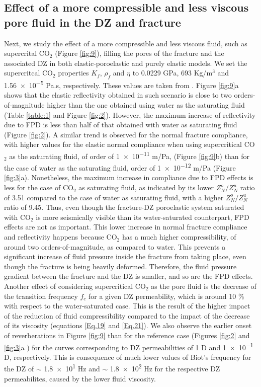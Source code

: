 \documentclass[draft]{agujournal2019}
\begin{document}
\subsection{Effect of a more compressible and less viscous pore fluid in the DZ and fracture}
Next, we study the effect of a more compressible and less viscous fluid, such as supercrital  CO$_2$ (Figure \ref{fig:9}), filling the pores of the fracture and the associated DZ in both elastic-poroelastic and purely elastic models. 
We set the supercritcal CO$_2$ properties $K_f$, $\rho_f$ and $\eta$ to 0.0229 GPa, 693 Kg/m$^3$ and \num{1.56e-5} Pa.s, respectively. These values are taken from . 
Figure \ref{fig:9}a shows that the elastic reflectivity obtained in such scenario is close to two orders-of-magnitude higher than the one obtained using water as the saturating fluid (Table \ref{table:1} and Figure \ref{fig:2}). However, the maximum increase of reflectivity due to FPD  is less than half of that obtained with water as saturating fluid (Figure \ref{fig:2}). 
A similar trend is observed for the normal fracture compliance, with  higher values for the elastic normal compliance when using supercritical CO$_2$ as the saturating fluid, of order of \num{1e-11} m/Pa, (Figure \ref{fig:9}b) than for the case of water as the saturating fluid,  order of \num{1e-12} m/Pa (Figure \ref{fig:3}a). Nonetheless, the maximum increase in compliance due to FPD effects is less for the case of CO$_2$ as saturating fluid, as indicated by its lower  $Z_N^o/Z_N^u$ ratio of 3.51 compared to the case of  water as  saturating fluid, with a higher $Z_N^o/Z_N^u$ ratio of 9.45.
Thus, even though the  fracture-DZ poroelastic system saturated with CO$_2$ is more seismically visible than its water-saturated counterpart, FPD effects are not as important.
This lower increase in normal fracture compliance and reflectivity happens because CO$_2$ has a much higher compressibility, of around two orders-of-magnitude, as compared to water.  This prevents a significant increase of fluid pressure inside the fracture from taking place, even though the fracture is being heavily deformed. Therefore, the fluid pressure gradient between the fracture and the DZ is smaller, and so are the FPD effects.
Another effect of considering supercritical CO$_2$ as the pore fluid is the decrease of the transition frequency $f_c$ for a given DZ permeability, which is around 10 \% with respect to the water-saturated case. This is the result of the higher impact of the reduction of  fluid compressibility compared to the impact of the decrease of its viscosity (equations \eqref{Eq.19} and \eqref{Eq.21}). We also observe the earlier onset of reverberations in Figure \ref{fig:9} than for the reference case (Figures \ref{fig:2} and \ref{fig:3}a ) for the curves corresponding to DZ permeabilities of 1 D and \num{1 e-1} D, respectively. This is consequence of much lower values of Biot's frequency for the DZ of $\sim$ \num{1.8e1} Hz and $\sim$ \num{1.8e2} Hz for the respective DZ permeabilites, caused by the lower fluid viscosity.
\end{document}
